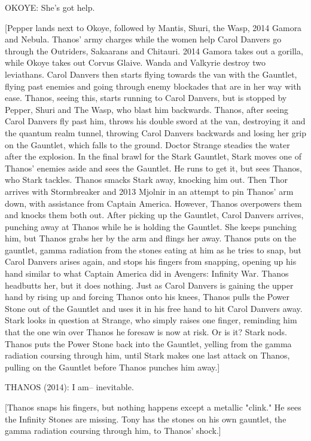 OKOYE: She's got help.

[Pepper lands next to Okoye, followed by Mantis, Shuri, the Wasp, 2014 Gamora and Nebula. Thanos' army charges while the women help Carol Danvers go through the Outriders, Sakaarans and Chitauri. 2014 Gamora takes out a gorilla, while Okoye takes out Corvus Glaive. Wanda and Valkyrie destroy two leviathans. Carol Danvers then starts flying towards the van with the Gauntlet, flying past enemies and going through enemy blockades that are in her way with ease. Thanos, seeing this, starts running to Carol Danvers, but is stopped by Pepper, Shuri and The Wasp, who blast him backwards. Thanos, after seeing Carol Danvers fly past him, throws his double sword at the van, destroying it and the quantum realm tunnel, throwing Carol Danvers backwards and losing her grip on the Gauntlet, which falls to the ground. Doctor Strange steadies the water after the explosion. In the final brawl for the Stark Gauntlet, Stark moves one of Thanos' enemies aside and sees the Gauntlet. He runs to get it, but sees Thanos, who Stark tackles. Thanos smacks Stark away, knocking him out. Then Thor arrives with Stormbreaker and 2013 Mjolnir in an attempt to pin Thanos' arm down, with assistance from Captain America. However, Thanos overpowers them and knocks them both out. After picking up the Gauntlet, Carol Danvers arrives, punching away at Thanos while he is holding the Gauntlet. She keeps punching him, but Thanos grabs her by the arm and flings her away. Thanos puts on the gauntlet, gamma radiation from the stones eating at him as he tries to snap, but Carol Danvers arises again, and stops his fingers from snapping, opening up his hand similar to what Captain America did in Avengers: Infinity War. Thanos headbutts her, but it does nothing. Just as Carol Danvers is gaining the upper hand by rising up and forcing Thanos onto his knees, Thanos pulls the Power Stone out of the Gauntlet and uses it in his free hand to hit Carol Danvers away. Stark looks in question at Strange, who simply raises one finger, reminding him that the one win over Thanos he foresaw is now at risk. Or is it? Stark nods. Thanos puts the Power Stone back into the Gauntlet, yelling from the gamma radiation coursing through him, until Stark makes one last attack on Thanos, pulling on the Gauntlet before Thanos punches him away.]

THANOS (2014): I am– inevitable.

[Thanos snaps his fingers, but nothing happens except a metallic "clink." He sees the Infinity Stones are missing. Tony has the stones on his own gauntlet, the gamma radiation coursing through him, to Thanos' shock.]

